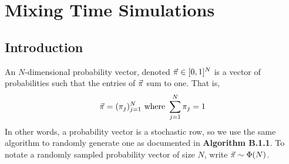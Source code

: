 \chapter{Mixing Time Simulations}
\section{Introduction}


%


\begin{definition}
An $N$-dimensional probability vector, denoted $\vec{\pi} \in [0,1]^N$ is a vector of probabilities such that the entries of $\vec{\pi}$ sum to one. That is,
$$\vec{\pi} = (\pi_j)_{j = 1}^N \text{ where } \sum_{j = 1}^N \pi_j = 1$$
In other words, a probability vector is a stochastic row, so we use the same algorithm to randomly generate one as documented in \textbf{Algorithm B.1.1}.
To notate a randomly sampled probability vector of size $N$, write $\vec{\pi} \sim \Phi(N)$.

\end{definition}


